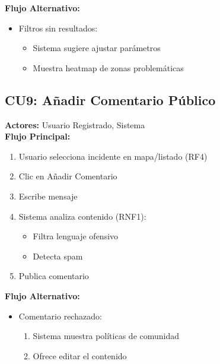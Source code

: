 \begin{multicols}{2}
\textbf{Flujo Alternativo:}
\begin{itemize}
    \item Filtros sin resultados:
    \begin{itemize}
        \item Sistema sugiere ajustar parámetros
        \item Muestra heatmap de zonas problemáticas
    \end{itemize}
\end{itemize}

\subsection*{CU9: Añadir Comentario Público}
\textbf{Actores:} Usuario Registrado, Sistema\\
\textbf{Flujo Principal:}
\begin{enumerate}
    \item Usuario selecciona incidente en mapa/listado (RF4)
    \item Clic en Añadir Comentario
    \item Escribe mensaje
    \item Sistema analiza contenido (RNF1):
    \begin{itemize}
        \item Filtra lenguaje ofensivo
        \item Detecta spam
    \end{itemize}
    \item Publica comentario
\end{enumerate}

\textbf{Flujo Alternativo:}
\begin{itemize}
    \item Comentario rechazado:
    \begin{enumerate}
        \item Sistema muestra políticas de comunidad
        \item Ofrece editar el contenido
    \end{enumerate}
\end{itemize}


\end{multicols}
